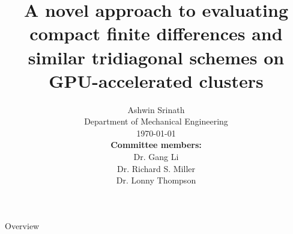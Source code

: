 \documentclass[10pt]{beamer}
\begin{document}
\title[Compact finite differences on GPUs]
{A novel approach to evaluating 
compact finite differences 
and similar tridiagonal schemes on GPU-accelerated clusters}


\author[Ashwin Srinath]{
        Ashwin Srinath\\
        Department of Mechanical Engineering\\
        \today \newline \\
        \textbf{Committee members:} \\
        Dr. Gang Li \\
        Dr. Richard S. Miller \\
    Dr. Lonny Thompson}
\date{}
\titlepage

\begin{frame}{Overview}
    \tableofcontents
\end{frame}








\end{document}
